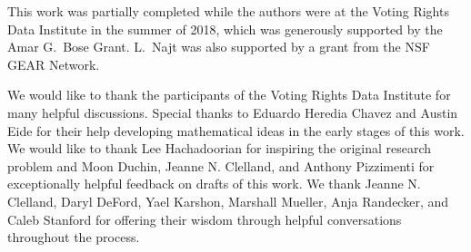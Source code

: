 
 This work was partially completed while the authors were at the Voting Rights Data Institute in the summer of 2018, which was generously supported by the Amar G.\ Bose Grant. L.\ Najt was also supported by a grant from the NSF GEAR Network.

We would like to thank the participants of the Voting Rights Data Institute for many helpful discussions. Special thanks to Eduardo Heredia Chavez and Austin Eide for their help developing mathematical ideas in the early stages of this work. We would like to thank Lee Hachadoorian for inspiring the original research problem and Moon Duchin, Jeanne N. Clelland, and Anthony Pizzimenti for exceptionally helpful feedback on drafts of this work.  We thank Jeanne N. Clelland, Daryl DeFord, Yael Karshon, Marshall Mueller, Anja Randecker, and Caleb Stanford for offering their wisdom through helpful conversations throughout the process.